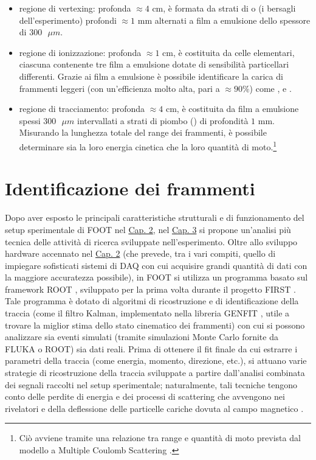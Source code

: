 \documentclass[12pt,a4paper,twoside]{report}
\begin{document}
	\begin{itemize}
		\item regione di vertexing: profonda $\approx4\mbox{ cm}$, è formata da strati di  o  (i bersagli dell'esperimento) profondi $\approx1\mbox{ mm}$ alternati a film a emulsione dello spessore di $300\mbox{ }\mu{m}$.
		\item regione di ionizzazione: profonda $\approx1\mbox{ cm}$, è costituita da celle elementari, ciascuna contenente tre film a emulsione dotate di sensibilità particellari differenti. Grazie ai film a emulsione è possibile identificare la carica di frammenti leggeri (con un'efficienza molto alta, pari a $\approx90\%$) come ,  e  \cite{deLellisConference}.
		\item regione di tracciamento: profonda $\approx4\mbox{ cm}$, è costituita da film a emulsione spessi $300\mbox{ }\mu{m}$ intervallati a strati di piombo () di profondità $1\mbox{ mm}$. Misurando la lunghezza totale del range dei frammenti, è possibile determinare sia la loro energia cinetica che la loro quantità di moto.\footnote{Ciò avviene tramite una relazione tra range e quantità di moto prevista dal modello a Multiple Coulomb Scattering \cite{articleAgafonova,DESERIO2003539}.}
	\end{itemize}
	
	\chapter{Identificazione dei frammenti}\label{cap:3}
	Dopo aver esposto le principali caratteristiche strutturali e di funzionamento del setup sperimentale di FOOT nel \hyperref[cap:2]{Cap. 2}, nel \hyperref[cap:3]{Cap. 3} si propone un'analisi più tecnica delle attività di ricerca sviluppate nell'esperimento. Oltre allo sviluppo hardware accennato nel \hyperref[cap:2]{Cap. 2} (che prevede, tra i vari compiti, quello di impiegare sofisticati sistemi di DAQ con cui acquisire grandi quantità di dati con la maggiore accuratezza possibile), in FOOT si utilizza un programma basato sul framework ROOT \cite{rene_brun}, sviluppato per la prima volta durante il progetto FIRST \cite{foot_cdr}. Tale programma è dotato di algoritmi di ricostruzione e di identificazione della traccia (come il filtro Kalman, implementato nella libreria GENFIT \cite{Rauch_2015}, utile a trovare la miglior stima dello stato cinematico dei frammenti) con cui si possono analizzare sia eventi simulati (tramite simulazioni Monte Carlo fornite da FLUKA o ROOT) sia dati reali. Prima di ottenere il fit finale da cui estrarre i parametri della traccia (come energia, momento, direzione, etc.), si attuano varie strategie di ricostruzione della traccia sviluppate a partire dall'analisi combinata dei segnali raccolti nel setup sperimentale; naturalmente, tali tecniche tengono conto delle perdite di energia e dei processi di scattering che avvengono nei rivelatori e della deflessione delle particelle cariche dovuta al campo magnetico \cite{ridolfiArticle}.
	
\end{document}
